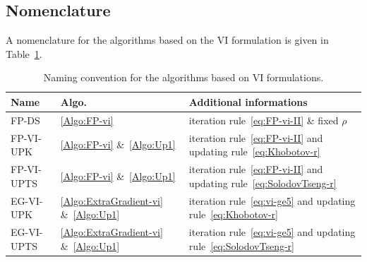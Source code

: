 {\subsection{Nomenclature}
A nomenclature for the algorithms based on the VI formulation is given in Table~\ref{tab:Projection-algos}.
\begin{table}
  \centering
  \begin{tabular}{|l|l|p{}|}
    \hline
    {Name}
    & Algo.
    & Additional informations
    \\
    \hline
    \hline
    \sf FP-DS
    &  \ref{Algo:FP-vi} & iteration rule~\eqref{eq:FP-vi-II} \& fixed $\rho$
    \\
    \hline
    \sf FP-VI-UPK
    &  \ref{Algo:FP-vi} \&~\ref{Algo:Up1} & iteration rule~\eqref{eq:FP-vi-II} and updating rule~\eqref{eq:Khobotov-r} 
    \\
    \hline
    \sf FP-VI-UPTS
    &  \ref{Algo:FP-vi} \&~\ref{Algo:Up1} & iteration rule~\eqref{eq:FP-vi-II} and  updating rule~\eqref{eq:SolodovTseng-r} 
    \\
    \hline
    \sf EG-VI-UPK
    & \ref{Algo:ExtraGradient-vi} \&~\ref{Algo:Up1} & iteration rule~\eqref{eq:vi-ge5} and updating rule~\eqref{eq:Khobotov-r}
    \\
    \hline
    \sf EG-VI-UPTS
    & \ref{Algo:ExtraGradient-vi} \&~\ref{Algo:Up1} & iteration rule~\eqref{eq:vi-ge5} and  updating rule~\eqref{eq:SolodovTseng-r}
    \\
    \hline
  \end{tabular}
  \caption{Naming convention for the algorithms based on VI formulations.}
  \label{tab:Projection-algos}
\end{table}
}
